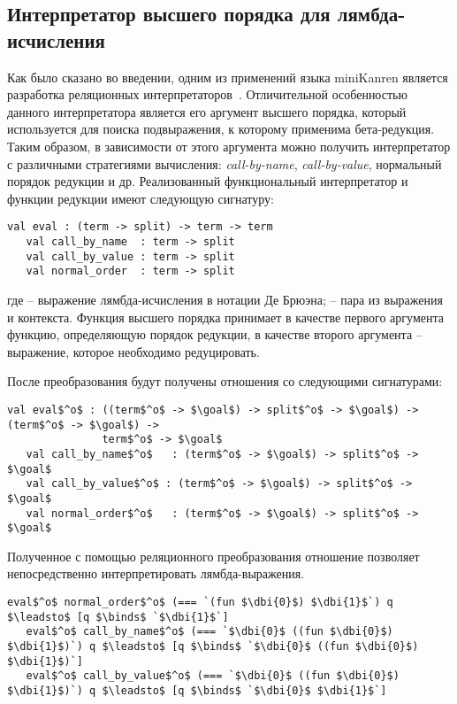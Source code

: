 \subsection{Интерпретатор высшего порядка для лямбда-исчисления}

Как было сказано во введении, одним из применений языка miniKanren является разработка реляционных интерпретаторов~\cite{lozov-spbu:quines,lozov-spbu:miniKanren,lozov-spbu:unified}. Отличительной особенностью данного интерпретатора является его аргумент высшего порядка, который используется для поиска подвыражения, к которому применима бета-редукция. Таким образом, в зависимости от этого аргумента можно получить интерпретатор с различными стратегиями вычисления: {\it call-by-name}, {\it call-by-value}, нормальный порядок редукции и др. Реализованный функциональный интерпретатор и функции редукции имеют следующую сигнатуру:

\begin{lstlisting}[basicstyle=\small]
   val eval : (term -> split) -> term -> term
   val call_by_name  : term -> split
   val call_by_value : term -> split
   val normal_order  : term -> split
\end{lstlisting}
где  -- выражение лямбда-исчисления в нотации Де Брюэна;  -- пара из выражения и контекста. Функция высшего порядка  принимает в качестве первого аргумента функцию, определяющую порядок редукции, в качестве второго аргумента -- выражение, которое необходимо редуцировать.

После преобразования будут получены отношения со следующими сигнатурами:
\begin{lstlisting}[basicstyle=\small]
   val eval$^o$ : ((term$^o$ -> $\goal$) -> split$^o$ -> $\goal$) -> (term$^o$ -> $\goal$) -> 
               term$^o$ -> $\goal$
   val call_by_name$^o$   : (term$^o$ -> $\goal$) -> split$^o$ -> $\goal$
   val call_by_value$^o$ : (term$^o$ -> $\goal$) -> split$^o$ -> $\goal$
   val normal_order$^o$   : (term$^o$ -> $\goal$) -> split$^o$ -> $\goal$
\end{lstlisting}

Полученное с помощью реляционного преобразования отношение позволяет непосредственно интерпретировать лямбда-выражения.

\begin{lstlisting}[basicstyle=\small]
   eval$^o$ normal_order$^o$ (=== `(fun $\dbi{0}$) $\dbi{1}$`) q $\leadsto$ [q $\binds$ `$\dbi{1}$`]   
   eval$^o$ call_by_name$^o$ (=== `$\dbi{0}$ ((fun $\dbi{0}$) $\dbi{1}$)`) q $\leadsto$ [q $\binds$ `$\dbi{0}$ ((fun $\dbi{0}$) $\dbi{1}$)`]   
   eval$^o$ call_by_value$^o$ (=== `$\dbi{0}$ ((fun $\dbi{0}$) $\dbi{1}$)`) q $\leadsto$ [q $\binds$ `$\dbi{0}$ $\dbi{1}$`] 
\end{lstlisting}

